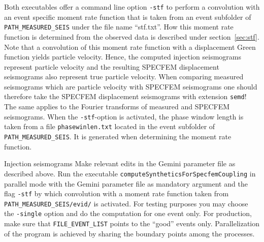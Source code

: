  Both executables offer a command line option \verb+-stf+ to perform a convolution with an event specific moment rate function that is taken from an event subfolder of \verb+PATH_MEASURED_SEIS+ under the file name ``stf.txt''. How this moment rate function is determined from the observed data is described under section~\ref{sec:stf}. Note that a convolution of this moment rate function with a displacement Green function yields particle velocity. Hence, the computed injection seismograms represent particle velocity and the resulting SPECFEM displacement seismograms also represent true particle velocity. When comparing measured seismograms which are particle velocity with SPECFEM seismograms one should therefore take the SPECFEM displacement seismograms with extension \verb+semd+! The same applies to the Fourier transforms of measured and SPECFEM seismograms. When the \verb+-stf+-option is activated, the phase window length is taken from a file \verb+phasewinlen.txt+ located in the event subfolder of \verb+PATH_MEASURED_SEIS+. It is generated when determining the moment rate function.
%
\begin{actionbox}[label={action:injection-seismograms},float=h!]{Injection seismograms}
   Make relevant edits in the Gemini parameter file as described above. Run the executable \verb+computeSyntheticsForSpecfemCoupling+ in parallel mode with the Gemini parameter file as mandatory argument and the flag \verb+-stf+ by which convolution with a moment rate function taken from \verb+PATH_MEASURED_SEIS/evid/+ is activated. For testing purposes you may choose the \verb+-single+ option and do the computation for one event only. For production, make sure that \verb+FILE_EVENT_LIST+ points to the ``good'' events only. Parallelization of the program is achieved by sharing the boundary points among the processes.
\end{actionbox}
